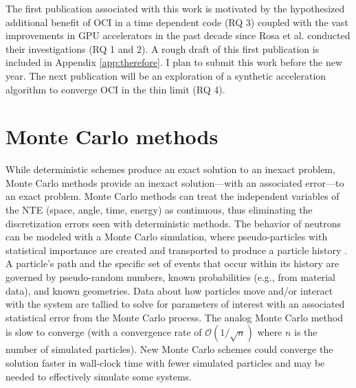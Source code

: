 The first publication associated with this work is motivated by the hypothesized additional benefit of OCI in a time dependent code (RQ 3) coupled with the vast improvements in GPU accelerators in the past decade since Rosa et al. \cite{rosa_cellwise_2013} conducted their investigations (RQ 1 and 2).
A rough draft of this first publication is included in Appendix \ref{app:therefore}.
I plan to submit this work before the new year.
The next publication will be an exploration of a synthetic acceleration algorithm to converge OCI in the thin limit (RQ 4).

\section {Monte Carlo methods}


While deterministic schemes produce an exact solution to an inexact problem, Monte Carlo methods provide an inexact solution---with an associated error---to an exact problem.
Monte Carlo methods can treat the independent variables of the NTE (space, angle, time, energy) as continuous, thus eliminating the discretization errors seen with deterministic methods.
The behavior of neutrons can be modeled with a Monte Carlo simulation, where pseudo-particles with statistical importance are created and transported to produce a particle history \cite{lewis_computational_1984}.
A particle's path and the specific set of events that occur within its history are governed by pseudo-random numbers, known probabilities (e.g., from material data), and known geometries.
Data about how particles move and/or interact with the system are tallied to solve for parameters of interest with an associated statistical error from the Monte Carlo process. 
The analog Monte Carlo method is slow to converge (with a convergence rate of $\mathcal{O}(1/\sqrt{n})$ where $n$ is the number of simulated particles).
New Monte Carlo schemes could converge the solution faster in wall-clock time with fewer simulated particles and may be needed to effectively simulate some systems.

